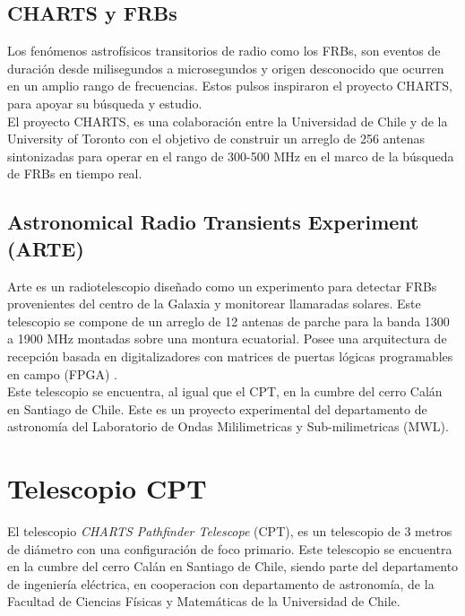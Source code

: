 \subsection{CHARTS y FRBs}

Los fenómenos astrofísicos transitorios de radio como los FRBs, son eventos de duración desde milisegundos a microsegundos y origen desconocido que ocurren en un amplio rango de frecuencias. Estos pulsos inspiraron el proyecto CHARTS, para apoyar su búsqueda y estudio.\\

El proyecto CHARTS, es una colaboración entre la Universidad de Chile y de la University of Toronto con el objetivo de construir un arreglo de 256 antenas sintonizadas para operar en el rango de 300-500 MHz en el marco de la búsqueda de FRBs en tiempo real.\\

\subsection{Astronomical Radio Transients Experiment (ARTE)}\label{ARTE}

Arte es un radiotelescopio diseñado como un experimento para detectar FRBs provenientes del centro de la Galaxia y monitorear llamaradas solares. Este telescopio se compone de un arreglo de 12 antenas de parche para la banda 1300 a 1900 MHz montadas sobre una montura ecuatorial. Posee una arquitectura de recepción basada en digitalizadores con matrices de puertas lógicas programables en campo (FPGA) \cite{arte}.\\

Este telescopio se encuentra, al igual que el CPT, en la cumbre del cerro Calán en Santiago de Chile. Este es un proyecto experimental del departamento de astronomía del Laboratorio de Ondas Mililimetricas y Sub-milimetricas (MWL).


\section{Telescopio CPT}

El telescopio \textit{CHARTS Pathfinder Telescope} (CPT), es un telescopio de 3 metros de diámetro con una configuración de foco primario. Este telescopio se encuentra en la cumbre del cerro Calán en Santiago de Chile, siendo parte del departamento de ingeniería eléctrica, en cooperacion con departamento de astronomía, de la Facultad de Ciencias Físicas y Matemáticas de la Universidad de Chile.\\

